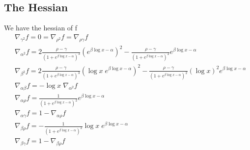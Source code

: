 \documentclass[a4paper,12pt]{article}
\begin{document}
\subsection{The Hessian}
We have the hessian of f
\begin{align*}
    &\nabla_{\gamma^{2}}f=0=\nabla_{\rho^{2}}f=\nabla_{\rho\gamma}f\\
    &\nabla_{\alpha^{2}}f=2\frac{\rho-\gamma}{\left(1+e^{\beta\log x -\alpha}\right)^{3}}\left(e^{\beta\log x - \alpha}\right)^{2}-\frac{\rho -\gamma}{\left(1+e^{\beta\log x - \alpha}\right)^{2}}e^{\beta\log x - \alpha}\\
    &\nabla_{\beta^{2}}f=2\frac{\rho - \gamma}{(1 + e^{\beta\log x -\alpha})^{3}}\left(\log x\;e^{\beta\log x - \alpha}\right)^{2}-\frac{\rho-\gamma}{\left(1 + e^{\beta\log x - \alpha}\right)^{2}}(\log x)^{2}e^{\beta\log x - \alpha}\\
    &\nabla_{\alpha\beta}f = -\log x\;\nabla_{\alpha^{2}}f\\
    &\nabla_{\alpha\rho}f = \frac{1}{\left(1 + e^{\beta\log x -\alpha}\right)^{2}}e^{\beta\log x - \alpha}\\
    &\nabla_{\alpha\gamma}f = 1 - \nabla_{\alpha\rho}f\\
    &\nabla_{\beta\rho}f = -\frac{1}{\left(1 + e^{\beta\log x -\alpha}\right)^{2}}\log x\; e^{\beta\log x -\alpha}\\
    &\nabla_{\beta\gamma}f = 1 - \nabla_{\beta\rho}f
\end{align*}
\end{document}
